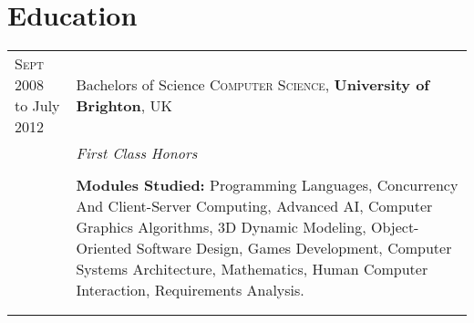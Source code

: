 \documentclass[a4paper,10pt]{article} %
\begin{document}
\section{Education}

\begin{tabular}{ L{2cm} | L{11cm}}	
\textsc{Sept} 2008 to July 2012  & Bachelors of Science \textsc{Computer Science}, \textbf{University of Brighton}, UK\\
& \small\emph{First Class Honors} \\
&\normalsize \\
& \small\textbf{Modules Studied:} Programming Languages, Concurrency And Client-Server Computing, Advanced AI, Computer Graphics Algorithms, 3D Dynamic Modeling, Object-Oriented Software Design, Games Development, Computer Systems Architecture, Mathematics, Human Computer Interaction, Requirements Analysis. \\
&\\

 \\




%
%
%
%

\end{tabular}
\end{document}
